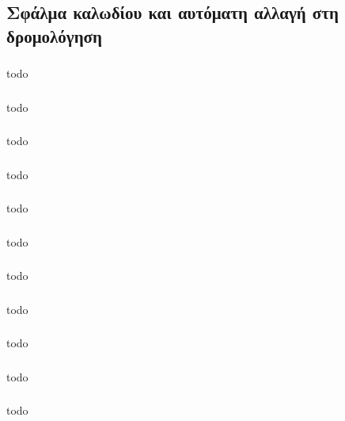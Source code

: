 \documentclass[a4paper, 12pt]{article}
\begin{document}
	\subsection{Σφάλμα καλωδίου και αυτόματη αλλαγή στη δρομολόγηση}

		\subsubsection{}
			todo

		\subsubsection{}
			todo

		\subsubsection{}
			todo

		\subsubsection{}
			todo

		\subsubsection{}
			todo

		\subsubsection{}
			todo

		\subsubsection{}
			todo

		\subsubsection{}
			todo

		\subsubsection{}
			todo

		\subsubsection{}
			todo

		\subsubsection{}
			todo
\end{document}
